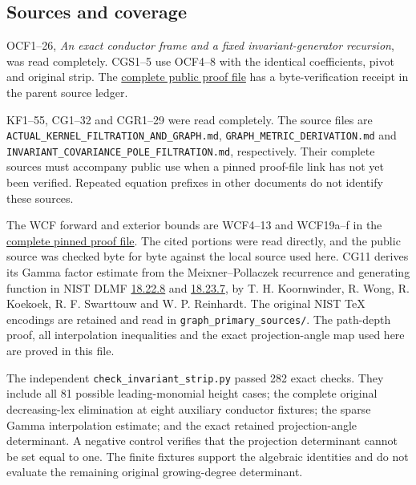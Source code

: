 \subsection{Sources and coverage}\label{sources-and-coverage}

OCF1--26, \emph{An exact conductor frame and a fixed invariant-generator recursion}, was read completely. CGS1--5 use OCF4--8 with the identical coefficients, pivot and original strip. The \href{https://github.com/KokunoYumeto/zeta-function-research-reader/blob/5992ad50c0f2a06921f1fcaded7b4e38097c0739/workbenches/splitzero-tandem/continuations/20260920-original-kernel-mixed-determinants/providers/ORIGINAL_CONDUCTOR_STRIP_FRAME.tex\#L27}{complete public proof file} has a byte-verification receipt in the parent source ledger.

KF1--55, CG1--32 and CGR1--29 were read completely. The source files are \nolinkurl{ACTUAL_KERNEL_FILTRATION_AND_GRAPH.md}, \nolinkurl{GRAPH_METRIC_DERIVATION.md} and \nolinkurl{INVARIANT_COVARIANCE_POLE_FILTRATION.md}, respectively. Their complete sources must accompany public use when a pinned proof-file link has not yet been verified. Repeated equation prefixes in other documents do not identify these sources.

The WCF forward and exterior bounds are WCF4--13 and WCF19a--f in the \href{https://github.com/KokunoYumeto/zeta-function-research-reader/blob/52274804051e325c8a6ef69c17b3958cc2caba0a/workbenches/splitzero-tandem/continuations/20260920-gamma-and-finite-derivative/providers/WEIGHTED_CONDUCTOR_FORWARD.tex}{complete pinned proof file}. The cited portions were read directly, and the public source was checked byte for byte against the local source used here. CG11 derives its Gamma factor estimate from the Meixner--Pollaczek recurrence and generating function in NIST DLMF \href{https://dlmf.nist.gov/18.22.E8}{18.22.8} and \href{https://dlmf.nist.gov/18.23.E7}{18.23.7}, by T. H. Koornwinder, R. Wong, R. Koekoek, R. F. Swarttouw and W. P. Reinhardt. The original NIST TeX encodings are retained and read in \nolinkurl{graph_primary_sources/}. The path-depth proof, all interpolation inequalities and the exact projection-angle map used here are proved in this file.

The independent \nolinkurl{check_invariant_strip.py} passed 282 exact checks. They include all 81 possible leading-monomial height cases; the complete original decreasing-lex elimination at eight auxiliary conductor fixtures; the sparse Gamma interpolation estimate; and the exact retained projection-angle determinant. A negative control verifies that the projection determinant cannot be set equal to one. The finite fixtures support the algebraic identities and do not evaluate the remaining original growing-degree determinant.

